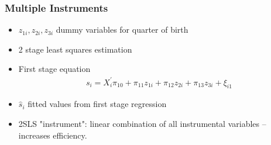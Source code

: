 \documentclass[pdftex]{beamer}
\begin{document}





\begin{frame}
\frametitle{Multiple Instruments}

\begin{itemize}
\item $z_{1i}, z_{2i} , z_{3i}$ dummy variables for quarter of birth
\item 2 stage least squares estimation
\item First stage equation
\[ \begin{array}{cl}
s_{i}= X_{i}^{'}\pi_{10}+\pi_{11}z_{1i}+\pi_{12}z_{2i}+\pi_{13}z_{3i}+\xi_{i1}
    \end{array}
\]

\item $\hat{s}_{i}$ fitted values from first stage regression

\item 2SLS "instrument": linear combination of all instrumental variables -- increases efficiency.
\end{itemize}

\end{frame}
\end{document}
